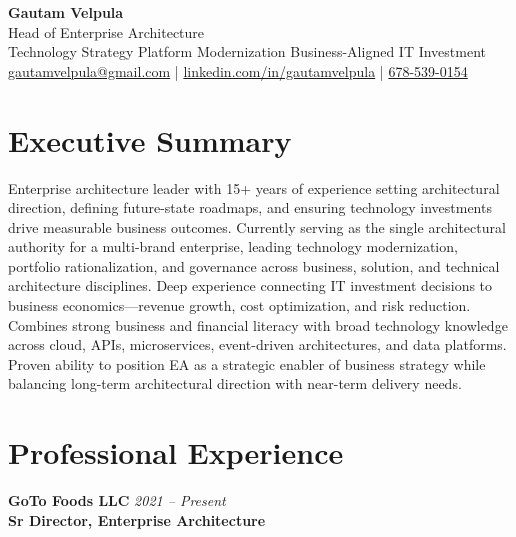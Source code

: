 \documentclass[11pt]{article}
\begin{document}
\begin{center}
    {\LARGE \textbf{Gautam Velpula}} \\[4pt]
    Head of Enterprise Architecture \\[6pt]
    Technology Strategy \textbullet{} Platform Modernization \textbullet{} Business-Aligned IT Investment \\[6pt]
    \href{mailto:gautamvelpula@gmail.com}{gautamvelpula@gmail.com} \;|\;
    \href{https://www.linkedin.com/in/gautamvelpula}{linkedin.com/in/gautamvelpula} \;|\;
    \href{tel:6785390154}{678-539-0154}
  \end{center}

\vspace{8pt}

\section*{Executive Summary}
Enterprise architecture leader with 15+ years of experience setting architectural direction, defining future-state roadmaps, and ensuring technology investments drive measurable business outcomes. Currently serving as the single architectural authority for a multi-brand enterprise, leading technology modernization, portfolio rationalization, and governance across business, solution, and technical architecture disciplines. Deep experience connecting IT investment decisions to business economics---revenue growth, cost optimization, and risk reduction. Combines strong business and financial literacy with broad technology knowledge across cloud, APIs, microservices, event-driven architectures, and data platforms. Proven ability to position EA as a strategic enabler of business strategy while balancing long-term architectural direction with near-term delivery needs.

\section*{Professional Experience}

\textbf{GoTo Foods LLC} \hfill \textit{2021 -- Present} \\
\textbf{Sr Director, Enterprise Architecture}
\end{document}

